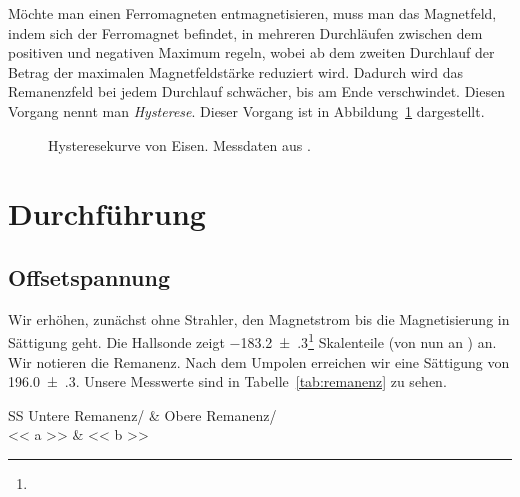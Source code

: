 Möchte man einen Ferromagneten entmagnetisieren, muss man das Magnetfeld, indem
sich der Ferromagnet befindet, in mehreren Durchläufen zwischen dem positiven
und negativen Maximum regeln, wobei ab dem zweiten Durchlauf der
Betrag der maximalen Magnetfeldstärke reduziert wird. Dadurch wird das
Remanenzfeld bei jedem Durchlauf schwächer, bis am Ende verschwindet. Diesen
Vorgang nennt man \emph{Hysterese}. Dieser Vorgang ist in
Abbildung~\ref{fig:hysterese} dargestellt.

\begin{figure}[htbp]
    \centering
    \caption{%
        Hysteresekurve von Eisen. Messdaten aus \parencite{Ueding/248}.
    }
    \label{fig:hysterese}
\end{figure}

\chapter{Durchführung}

\section{Offsetspannung}

Wir erhöhen, zunächst ohne Strahler, den Magnetstrom bis die Magnetisierung
in Sättigung geht. Die Hallsonde zeigt
\num{-183.2(3)}\footnote{\erklaerungFehlerNotation} Skalenteile (von nun an
\si{\skt}) an. Wir notieren die
Remanenz. Nach dem Umpolen erreichen wir eine Sättigung von
\SI{196.0(3)}{\skt}. Unsere Messwerte sind in Tabelle~\ref{tab:remanenz} zu
sehen.

\begin{table}[htbp]
    \centering
    \begin{tabular}{SS}
        {Untere Remanenz/\si{\skt}} & {Obere Remanenz/\si{\skt}}\\
        \midrule
        << a >> & << b >> \\
    \end{tabular}
    \caption{%
        Untere und obere Remanenz der Spektrometer-Hysterese.
    }
    \label{tab:remanenz}
\end{table}

